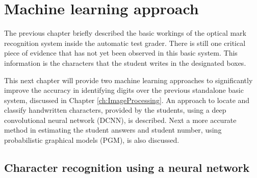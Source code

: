 \chapter{Machine learning approach}
\label{ch:MachineLearning}
\graphicspath{{Chapter4/Chapter4Figures/}}

The previous chapter briefly described the basic workings of the optical mark recognition system inside the automatic test grader. There is still one critical piece of evidence that has not yet been observed in this basic system. This information is the characters that the student writes in the designated boxes.

This next chapter will provide two machine learning approaches to significantly improve the accuracy in identifying digits over the previous standalone basic system, discussed in Chapter \ref{ch:ImageProcessing}. An approach to locate and classify handwritten characters, provided by the students, using a deep convolutional neural network (DCNN), is described. Next a more accurate method in estimating the  student answers and student number, using probabilistic  graphical models (PGM), is also discussed. 

\section{Character recognition using a neural network}

